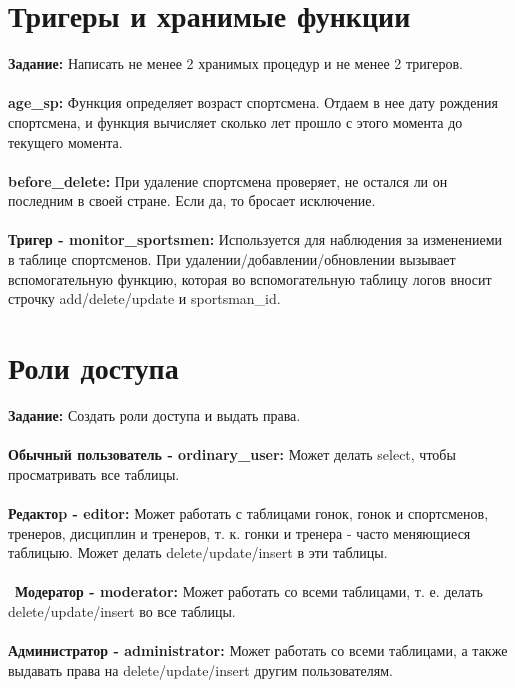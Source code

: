 \documentclass[a4paper,12pt]{article}
\begin{document}
\section{Тригеры и хранимые функции}
\textbf{Задание:} Написать не менее 2 хранимых процедур и не менее 2 тригеров.\\ \\
\textbf{age\_sp:} Функция определяет возраст спортсмена. Отдаем в нее дату рождения спортсмена, и функция вычисляет сколько лет прошло с этого момента до текущего момента.\\ \\
\textbf{before\_delete:} При удаление спортсмена проверяет, не остался ли он последним в своей стране. Если да, то бросает исключение. \\ \\
\textbf{Тригер - monitor\_sportsmen:} Используется для наблюдения за изменениеми в таблице спортсменов. При удалении/добавлении/обновлении вызывает вспомогательную функцию, которая во вспомогательную таблицу логов вносит строчку add/delete/update и sportsman\_id.\\

\section{Роли доступа}
\textbf{Задание:} Создать роли доступа и выдать права.\\ \\
\textbf{Обычный пользователь - ordinary\_user:} Может делать select, чтобы просматривать все таблицы.\\ \\
\textbf{Редактоp - editor:} Может работать с таблицами гонок, гонок и спортсменов, тренеров, дисциплин и тренеров, т. к. гонки и тренера - часто меняющиеся таблицыю. Может делать delete/update/insert в эти таблицы.\\\\\
\textbf{Модератор - moderator:} Может работать со всеми таблицами, т. е. делать delete/update/insert во все таблицы. \\\\
\textbf{Администратор - administrator:} Может работать со всеми таблицами, а также выдавать права на delete/update/insert другим пользователям.
\newpage
\end{document}
